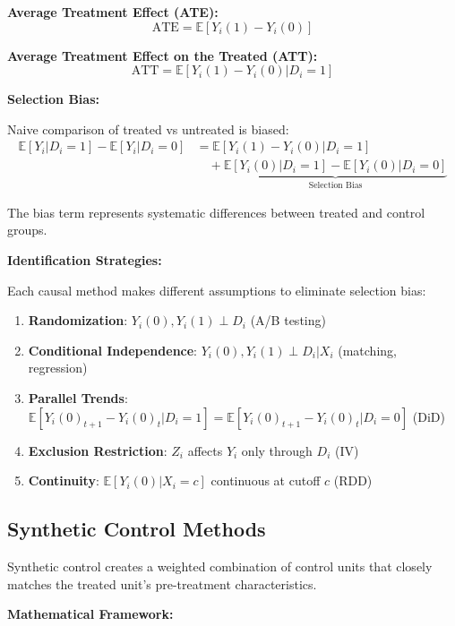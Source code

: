 \textbf{Average Treatment Effect (ATE):}
\begin{equation}
\text{ATE} = \mathbb{E}[Y_i(1) - Y_i(0)]
\end{equation}

\textbf{Average Treatment Effect on the Treated (ATT):}
\begin{equation}
\text{ATT} = \mathbb{E}[Y_i(1) - Y_i(0) | D_i = 1]
\end{equation}

\textbf{Selection Bias:}

Naive comparison of treated vs untreated is biased:
\begin{align}
\mathbb{E}[Y_i | D_i = 1] - \mathbb{E}[Y_i | D_i = 0] &= \mathbb{E}[Y_i(1) - Y_i(0) | D_i = 1] \\
&\quad + \underbrace{\mathbb{E}[Y_i(0) | D_i = 1] - \mathbb{E}[Y_i(0) | D_i = 0]}_{\text{Selection Bias}}
\end{align}

The bias term represents systematic differences between treated and control groups.

\textbf{Identification Strategies:}

Each causal method makes different assumptions to eliminate selection bias:

\begin{enumerate}
    \item \textbf{Randomization}: $Y_i(0), Y_i(1) \perp D_i$ (A/B testing)
    \item \textbf{Conditional Independence}: $Y_i(0), Y_i(1) \perp D_i | X_i$ (matching, regression)
    \item \textbf{Parallel Trends}: $\mathbb{E}[Y_i(0)_{t+1} - Y_i(0)_t | D_i=1] = \mathbb{E}[Y_i(0)_{t+1} - Y_i(0)_t | D_i=0]$ (DiD)
    \item \textbf{Exclusion Restriction}: $Z_i$ affects $Y_i$ only through $D_i$ (IV)
    \item \textbf{Continuity}: $\mathbb{E}[Y_i(0) | X_i = c]$ continuous at cutoff $c$ (RDD)
\end{enumerate}

\subsection{Synthetic Control Methods}

Synthetic control creates a weighted combination of control units that closely matches the treated unit's pre-treatment characteristics.

\textbf{Mathematical Framework:}

